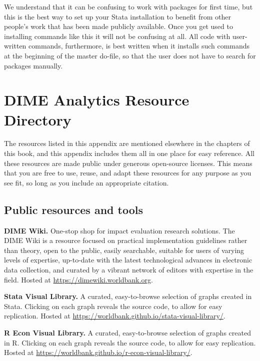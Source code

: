 \documentclass[
]{book}
\begin{document}
We understand that it can be confusing to work with packages for first time,
but this is the best way to set up your Stata installation to benefit from other
people's work that has been made publicly available.
Once you get used to installing commands like this it will not be confusing at all.
All code with user-written commands, furthermore, is best written when it installs such commands
at the beginning of the master do-file,
so that the user does not have to search for packages manually.

\hypertarget{resources}{%
\chapter{DIME Analytics Resource Directory}\label{resources}}

The resources listed in this appendix are mentioned elsewhere in the chapters of this book,
and this appendix includes them all in one place for easy reference.
All these resources are made public under generous open-source licenses.
This means that you are free to use, reuse, and adapt these resources for any purpose as you see fit,
so long as you include an appropriate citation.

\hypertarget{public-resources-and-tools}{%
\section*{Public resources and tools}\label{public-resources-and-tools}}

\textbf{DIME Wiki.} One-stop shop for impact evaluation research solutions. The DIME Wiki is a resource focused on practical implementation guidelines rather than theory, open to the public, easily searchable, suitable for users of varying levels of expertise, up-to-date with the latest technological advances in electronic data collection, and curated by a vibrant network of editors with expertise in the field.
Hosted at \url{https://dimewiki.worldbank.org}.

\textbf{Stata Visual Library.} A curated, easy-to-browse selection of graphs created in Stata. Clicking on each graph reveals the source code, to allow for easy replication.
Hosted at \url{https://worldbank.github.io/stata-visual-library/}.

\textbf{R Econ Visual Library.} A curated, easy-to-browse selection of graphs created in R. Clicking on each graph reveals the source code, to allow for easy replication.
Hosted at \url{https://worldbank.github.io/r-econ-visual-library/}.
\end{document}
